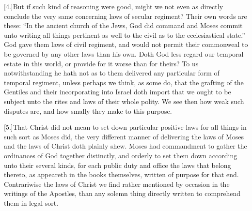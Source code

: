[4.]But if such kind of reasoning were good, might we not even as directly conclude the very same concerning laws of secular regiment? Their own words are these: “In the ancient church of the Jews, God did command and Moses commit unto writing all things pertinent as well to the civil as to the ecclesiastical state.” God gave them laws of civil regiment, and would not permit their commonweal to be governed by any other laws than his own. Doth God less regard our temporal estate in this world, or provide for it  worse than for theirs? To us notwithstanding he hath not as to them delivered any particular form of temporal regiment, unless perhaps we think, as some do, that the grafting of the Gentiles and their incorporating into Israel doth import that we ought to be subject unto the rites and laws of their whole polity. We see then how weak such disputes are, and how smally they make to this purpose.

[5.]That Christ did not mean to set down particular positive laws for all things in such sort as Moses did, the very different manner of delivering the laws of Moses and the laws of Christ doth plainly shew. Moses had commandment to gather the ordinances of God together distinctly, and orderly to set them down according unto their several kinds, for each public duty and office the laws that belong thereto, as appeareth in the books themselves, written of purpose for that end. Contrariwise the laws of Christ we find rather mentioned by occasion in the writings of the Apostles, than any solemn thing directly written to comprehend them in legal sort.

